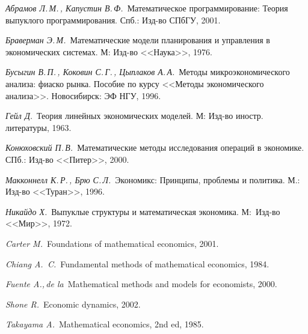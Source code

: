 \begin{thebibliography}{99}

\emph{Абрамов Л.\,М.\,, Капустин В.\,Ф.\,} Математическое
программирование: Теория выпуклого программирования. Спб.: Изд-во
СПбГУ, 2001.

\emph{Браверман Э.\,М.\,} Математические модели планирования и
управления в экономических системах. М: Изд-во <<Наука>>, 1976.

\emph{Бусыгин В.\,П.\,, Коковин С.\,Г.\,, Цыплаков А.\,А.\,} Методы
микроэкономического анализа: фиаско рынка. Пособие по курсу <<Методы
экономического анализа>>. Новосибирск: ЭФ НГУ, 1996.

\emph{Гейл Д.\,} Теория линейных экономических моделей. М: Изд-во
иностр. литературы, 1963.

\emph{Конюховский П.\,В.\,} Математические методы исследования
операций в экономике. СПб.: Изд-во <<Питер>>, 2000.

\emph{Макконнелл К.\,Р.\,, Брю С.\,Л.\,} Экономикс: Принципы,
проблемы и политика. М.: Изд-во <<Туран>>, 1996.

 \emph{Никайдо Х.\,} Выпуклые
структуры и математическая экономика. М:~Изд-во <<Мир>>, 1972.

\emph{Carter M.\,} Foundations of mathematical economics, 2001.

\emph{Chiang A.\, C.\,} Fundamental methods of mathematical
economics, 1984.

\emph{Fuente A.,\,de la\,} Mathematical methods and models for
economists, 2000.

\emph{Shone R.\,} Economic dynamics, 2002.

\emph{Takayama A.\,} Mathematical economics, 2nd ed, 1985.

\end{thebibliography}

